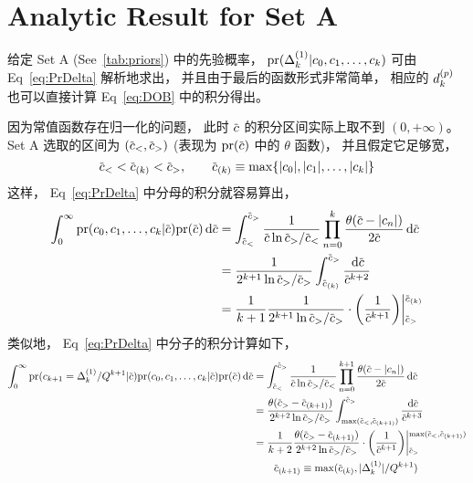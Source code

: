 
\section{Analytic Result for Set A}
给定 Set A (See~\ref{tab:priors}) 中的先验概率，
$\textrm{pr}(\Delta_k^{(1)}|c_0,c_1,\ldots,c_k)$ 可由 Eq~\eqref{eq:PrDelta} 解析地求出，
并且由于最后的函数形式非常简单，
相应的 $d_k^{(p)}$ 也可以直接计算 Eq~\eqref{eq:DOB} 中的积分得出。

因为常值函数存在归一化的问题，
此时 $\dmscbar$ 的积分区间实际上取不到 $(0,+\infty)$。
Set A 选取的区间为 $(\dmscbar_<,\dmscbar_>)$
(表现为 $\dmspr(\dmscbar)$ 中的 $\theta$ 函数)，
并且假定它足够宽，
\begin{equation}
  \label{eq:4-1}
  \dmscbar_< < \dmscbar_{(k)} < \dmscbar_>,\qquad
  \dmscbar_{(k)}\equiv\max\{|c_0|,|c_1|,\ldots,|c_k|\}
\end{equation}
这样，
Eq~\eqref{eq:PrDelta} 中分母的积分就容易算出，
\begin{equation}
  \label{eq:4-2}
  \begin{aligned}
    \int_0^\infty\dmspr(\dmsccck|\dmscbar)\dmspr(\dmscbar)\dmsdif\dmscbar
    &=  \int_{\dmscbar_<}^{\dmscbar_>} \frac{1}{\dmscbar\ln\dmscbar_>/\dmscbar_<}
    \prod_{n=0}^{k} \frac{\theta(\dmscbar-|c_n|)}{2\dmscbar}\dmsdif\dmscbar\\
    &=  \frac{1}{2^{k+1}\ln\dmscbar_>/\dmscbar_>}\int_{\dmscbar_{(k)}}^{\dmscbar_>}
    \frac{\dmsdif\dmscbar}{\dmscbar^{k+2}} \\
    &= \frac{1}{k+1} \frac{1}{2^{k+1}\ln\dmscbar_>/\dmscbar_>}\cdot\biggl(
    \frac{1}{\dmscbar^{k+1}}\biggr)\dmsvat[\bigg]{\dmscbar_>}{\dmscbar_{(k)}}
  \end{aligned}
\end{equation}
类似地，
Eq~\eqref{eq:PrDelta} 中分子的积分计算如下，
\begin{equation}
  \label{eq:4-3}
  \begin{aligned}
    \int_0^\infty\dmspr(c_{k+1}=\dmsdeltako/Q^{k+1}|\dmscbar)
    \dmspr(\dmsccck|\dmscbar)\dmspr(\dmscbar)\dmsdif\dmscbar
    &= \int_{\dmscbar_<}^{\dmscbar_>} \frac{1}{\dmscbar\ln\dmscbar_>/\dmscbar_<}
    \prod_{n=0}^{k+1}\frac{\theta(\dmscbar-|c_n|)}{2\dmscbar}\dmsdif\dmscbar\\
    &= \frac{\theta(\dmscbar_>-\dmscbar_{(k+1)})}{2^{k+2}
      \ln\dmscbar_>/\dmscbar_>}\int^{\dmscbar_>}_{\max(\dmscbar_<,\dmscbar_{(k+1)})}
    \frac{\dmsdif\dmscbar}{\dmscbar^{k+3}} \\
    &= \frac{1}{k+2} \frac{\theta(\dmscbar_>-\dmscbar_{(k+1)})
    }{2^{k+2}\ln\dmscbar_>/\dmscbar_>}\cdot\biggl(
    \frac{1}{\dmscbar^{k+1}}\biggr)\dmsvat[\bigg]{\dmscbar_>}{
      \max(\dmscbar_<,\dmscbar_{(k+1)})}\\
    &\qquad\dmscbar_{(k+1)}\equiv\max(\dmscbar_{(k)},|\dmsdeltako|/Q^{k+1})
  \end{aligned}
\end{equation}

